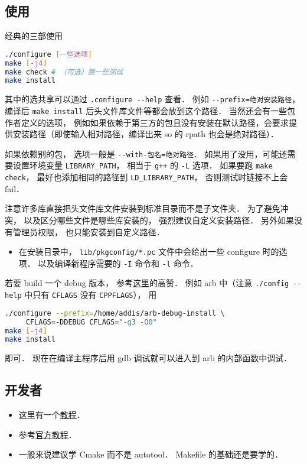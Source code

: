 
\begin{issues}
\issueDraft
\end{issues}



\subsection{使用}
经典的三部使用
\begin{lstlisting}[language=bash]
./configure [一些选项]
make [-j4]
make check # （可选）跑一些测试
make install
\end{lstlisting}
其中的选共享可以通过 \verb|.configure --help| 查看． 例如 \verb|--prefix=绝对安装路径|， 编译后 \verb|make install| 后头文件库文件等都会放到这个路径． 当然还会有一些包作者定义的选项， 例如如果依赖于第三方的包且没有安装在默认路径，会要求提供安装路径（即使输入相对路径，编译出来 so 的 rpath 也会是绝对路径）．

如果依赖别的包， 选项一般是 \verb|--with-包名=绝对路径|． 如果用了没用，可能还需要设置环境变量 \verb|LIBRARY_PATH|， 相当于 \verb|g++| 的 \verb|-L| 选项． 如果要跑 \verb|make check|， 最好也添加相同的路径到 \verb|LD_LIBRARY_PATH|， 否则测试时链接不上会 fail．

注意许多库直接把头文件库文件安装到标准目录而不是子文件夹． 为了避免冲突， 以及区分哪些文件是哪些库安装的， 强烈建议自定义安装路径． 另外如果没有管理员权限， 也只能安装到自定义路径．

\begin{itemize}
\item 在安装目录中， \verb|lib/pkgconfig/*.pc| 文件中会给出一些 configure 时的选项． 以及编译新程序需要的 \verb|-I| 命令和 \verb|-l| 命令．
\end{itemize}

若要 build 一个 debug 版本， 参考\href{https://stackoverflow.com/questions/4553735/gnu-autotools-debug-release-targets}{这里}的高赞． 例如 arb 中（注意 \verb|./config --help| 中只有 \verb|CFLAGS| 没有 \verb|CPPFLAGS|）， 用
\begin{lstlisting}[language=bash]
./configure --prefix=/home/addis/arb-debug-install \
     CFLAGS=-DDEBUG CFLAGS="-g3 -O0"
make [-j4]
make install
\end{lstlisting}
即可． 现在在编译主程序后用 gdb 调试就可以进入到 arb 的内部函数中调试．

\subsection{开发者}
\begin{itemize}
\item 这里有一个\href{https://devmanual.gentoo.org/general-concepts/autotools/index.html}{教程}．
\item 参考\href{https://www.gnu.org/software/automake/manual/html_node/Autotools-Introduction.html}{官方教程}．
\item 一般来说建议学 Cmake\upref{CMakeN} 而不是 autotool． Makefile 的基础还是要学的．
\end{itemize}
